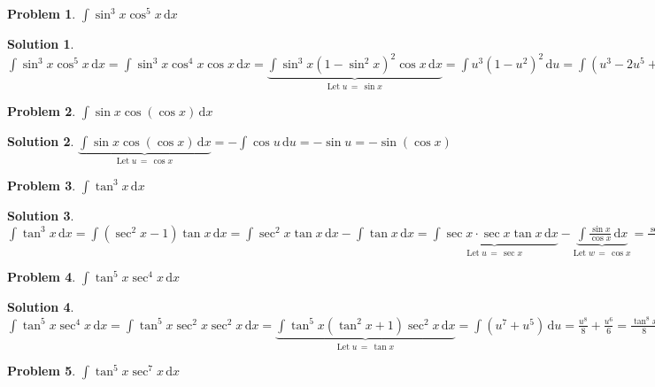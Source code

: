 \documentclass[11pt,a4paper]{article}
\newcommand{\ds}{\displaystyle}
\theoremstyle{definition}
\newtheorem*{problem}{Problem}
\newtheorem*{solution}{Solution}
\begin{document}
\begin{problem}
  $\ds\int\!\sin^3\!x \cos^5\!x \,\text{d}x$
\end{problem}

\begin{solution}
  $\ds\int\!\sin^3\!x \cos^5\!x \,\text{d}x = \int\!\sin^3\!x \cos^4\!x \cos x\,\text{d}x = \underbrace{\int\!\sin^3\!x (1 - \sin^2\!x)^2 \cos x\,\text{d}x}_{\text{Let}\;u\,=\,\sin x} = \int\!u^3(1 - u^2)^2\,\text{d}u = \int(u^3 - 2u^5 + u^7)\,\text{d}u = \frac{u^4}{4} - \frac{u^6}{3} + \frac{u^8}{8} = \frac{\sin^4\!x}{4} - \frac{\sin^6\!x}{3} + \frac{\sin^8\!x}{8}$
\end{solution}

\begin{problem}
  $\ds\int\!\sin x \cos(\cos x)\,\text{d}x$
\end{problem}

\begin{solution}
  $\ds\underbrace{\int\!\sin x\cos(\cos x)\,\text{d}x}_{\text{Let}\;u\,=\,\cos x} = -\int\!\cos u\,\text{d}u = -\sin u = -\sin(\cos x)$
\end{solution}

\begin{problem}
  $\ds\int\!\tan^3\!x\,\text{d}x$
\end{problem}

\begin{solution}
  $\ds\int\!\tan^3 x\,\text{d}x = \int\!(\sec^2 x - 1)\tan x\,\text{d}x = \int\!\sec^2 x\tan x\,\text{d}x - \int\!\tan x\,\text{d}x = \underbrace{\int\!\sec x\cdot\sec x\tan x\,\text{d}x}_{\text{Let}\;u\,=\,\sec x} - \underbrace{\int\!\frac{\sin x}{\cos x}\,\text{d}x}_{\text{Let}\;w\,=\,\cos x} = \frac{\sec^2 x}{2} + \ln|\cos x|$
\end{solution}

\begin{problem}
  $\ds\int\!\tan^5 x\sec^4 x\,\text{d}x$
\end{problem}

\begin{solution}
  $\ds\int\!\tan^5 x\sec^4 x\,\text{d}x = \int\!\tan^5 x\sec^2 x\sec^2 x\,\text{d}x = \underbrace{\int\!\tan^5 x(\tan^2 x + 1)\sec^2 x\,\text{d}x}_{\text{Let}\;u\,=\,\tan x} = \int\!(u^7 + u^5)\,\text{d}u = \frac{u^8}{8} + \frac{u^6}{6} = \frac{\tan^8 x}{8} + \frac{\tan^6 x}{6}$
\end{solution}

\begin{problem}
  $\ds\int\!\tan^5 x \sec^7 x\,\text{d}x$
\end{problem}
\end{document}
